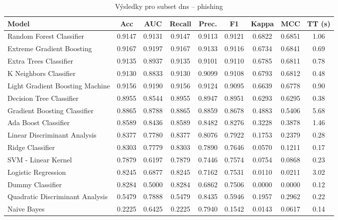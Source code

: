 \begin{table}[H]
  \centering
  \small
  \caption{Výsledky pro subset dns – phishing}
  \begin{tabular}{|l|c|c|c|c|c|c|c|c|}
    \hline
    \textbf{Model} & \textbf{Acc} & \textbf{AUC} & \textbf{Recall} & \textbf{Prec.} & \textbf{F1} & \textbf{Kappa} & \textbf{MCC} & \textbf{TT (s)} \\
    \hline
    Random Forest Classifier & 0.9147 & 0.9131 & 0.9147 & 0.9113 & 0.9121 & 0.6822 & 0.6851 & 1.06 \\
    Extreme Gradient Boosting & 0.9167 & 0.9197 & 0.9167 & 0.9133 & 0.9116 & 0.6734 & 0.6841 & 0.69 \\
    Extra Trees Classifier & 0.9135 & 0.8937 & 0.9135 & 0.9101 & 0.9110 & 0.6785 & 0.6811 & 0.78 \\
    K Neighbors Classifier & 0.9130 & 0.8833 & 0.9130 & 0.9099 & 0.9108 & 0.6793 & 0.6812 & 0.48 \\
    Light Gradient Boosting Machine & 0.9156 & 0.9190 & 0.9156 & 0.9124 & 0.9095 & 0.6639 & 0.6778 & 0.90 \\
    Decision Tree Classifier & 0.8955 & 0.8544 & 0.8955 & 0.8947 & 0.8951 & 0.6293 & 0.6295 & 0.38 \\
    Gradient Boosting Classifier & 0.8865 & 0.8788 & 0.8865 & 0.8859 & 0.8678 & 0.4883 & 0.5406 & 5.68 \\
    Ada Boost Classifier & 0.8589 & 0.8436 & 0.8589 & 0.8482 & 0.8276 & 0.3228 & 0.3878 & 1.46 \\
    Linear Discriminant Analysis & 0.8377 & 0.7780 & 0.8377 & 0.8076 & 0.7922 & 0.1753 & 0.2379 & 0.28 \\
    Ridge Classifier & 0.8303 & 0.7779 & 0.8303 & 0.7890 & 0.7646 & 0.0570 & 0.1211 & 0.17 \\
    SVM - Linear Kernel & 0.7879 & 0.6197 & 0.7879 & 0.7446 & 0.7574 & 0.0754 & 0.0868 & 0.23 \\
    Logistic Regression & 0.8245 & 0.6877 & 0.8245 & 0.7162 & 0.7531 & 0.0110 & 0.0211 & 3.02 \\
    Dummy Classifier & 0.8284 & 0.5000 & 0.8284 & 0.6862 & 0.7506 & 0.0000 & 0.0000 & 0.12 \\
    Quadratic Discriminant Analysis & 0.5479 & 0.7888 & 0.5479 & 0.8435 & 0.5946 & 0.1957 & 0.2962 & 0.22 \\
    Naive Bayes & 0.2225 & 0.6425 & 0.2225 & 0.7940 & 0.1542 & 0.0143 & 0.0617 & 0.14 \\
    \hline
  \end{tabular}
\end{table}
\vspace{0.5cm}

